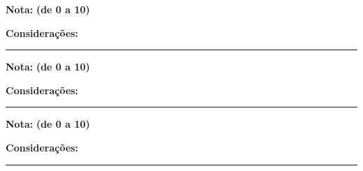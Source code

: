     \textbf{Nota:} \underline{\hspace{1.5cm}} \quad \textbf{(de 0 a 10)}    
    
    \textbf{Considerações:}
    
    \vspace{21cm}
    
    \hfill \rule{10cm}{0.4pt}
        
    \hfill {}

\newpage

    \textbf{Nota:} \underline{\hspace{1.5cm}} \quad \textbf{(de 0 a 10)}    
    
    \textbf{Considerações:}
    
    \vspace{21cm}
    
    \hfill \rule{10cm}{0.4pt}
        
    \hfill {}

\newpage

    \textbf{Nota:} \underline{\hspace{1.5cm}} \quad \textbf{(de 0 a 10)}    
    
    \textbf{Considerações:}
    
    \vspace{21cm}
    
    \hfill \rule{10cm}{0.4pt}
        
    \hfill {}